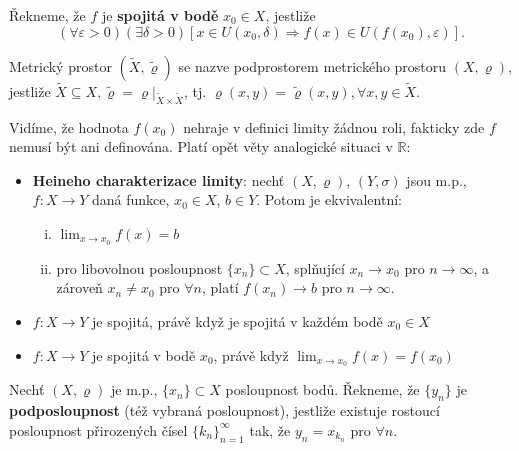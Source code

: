 \begin{definice}
Řekneme, že $f$ je \textbf{spojitá v bodě} $x_0 \in X$, jestliže
\[
\left(\forall \varepsilon > 0\right) \left(\exists \delta > 0\right) \left[ x \in U(x_0, \delta) \Longrightarrow f(x) \in U(f(x_0), \varepsilon) \right].
\]
\end{definice}

\begin{definice}
  Metrický prostor $(\tilde{X}, \tilde{\varrho})$ se nazve podprostorem metrického prostoru $(X, \varrho)$, jestliže $\tilde{X}\subseteq X, \tilde{\varrho} = \varrho|_{\tilde{X}\times \tilde{X}}$, tj. $\varrho(x, y)=\tilde{\varrho}(x, y), \forall x,y \in \tilde{X}$.
\end{definice}

\begin{poznamka}
Vidíme, že hodnota $f(x_0)$ nehraje v definici limity žádnou roli, fakticky zde $f$ nemusí být ani definována. Platí opět věty analogické situaci v $\mathbb R$:

\begin{itemize}
    \item \textbf{Heineho charakterizace limity}: nechť $(X, \varrho)$, $(Y, \sigma)$ jsou m.p., $f: X \to Y$ daná funkce, $x_0 \in X$, $b \in Y$. Potom je ekvivalentní:

    \begin{enumerate}[i.]
        \item $\lim_{x\to x_0}f(x) = b$
        \item pro libovolnou posloupnost $\{x_n\} \subset X$, splňující $x_n \to x_0$ pro $n \to \infty$, a zároveň $x_n \neq x_0$ pro $\forall n$, platí $f(x_n) \to b$ pro $n \to \infty$.
    \end{enumerate}

    \item $f: X \to Y$ je spojitá, právě když je spojitá v každém bodě $x_0 \in X$

    \item $f: X \to Y$ je spojitá v bodě $x_0$, právě když $\lim_{x \to x_0} f(x) = f(x_0)$
\end{itemize}
\end{poznamka}

\begin{definice}
Nechť $(X, \varrho)$ je m.p., $\{x_n\} \subset X$ posloupnost bodů. Řekneme, že $\{y_n\}$ je \textbf{podposloupnost} (též vybraná posloupnost), jestliže existuje rostoucí posloupnost přirozených čísel $\{k_n\}_{n=1}^\infty$ tak, že $y_n = x_{k_n}$ pro $\forall n$.
\end{definice}

